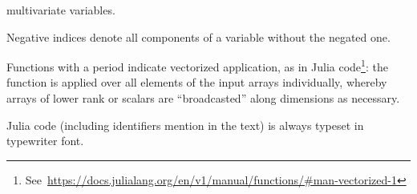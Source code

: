 \begin{description}[style=nextline, leftmargin=4cm]
  multivariate variables.
\item[{\(z_{-i} = [z_{1}, \ldots, z_{i-1}, z_{i+1}, \ldots, z_{N}]\)}] Negative indices denote all
  components of a variable without the negated one.
\item[{\(\broadcast{f}(x, 1) = [f(x_{1}, 1), \ldots, f(x_{N}, 1)]\)}] Functions with a period
  indicate vectorized application, as in Julia
  code\footnote{See~\protect\url{https://docs.julialang.org/en/v1/manual/functions/\#man-vectorized-1}}:
  the function is applied over all elements of the input arrays individually, whereby arrays of
  lower rank or scalars are \enquote{broadcasted} along dimensions as necessary.
\item[{\jlinlfont f(x) = rand(x)}] Julia code (including identifiers mention in the text) is always typeset in
  typewriter font.
\end{description}

